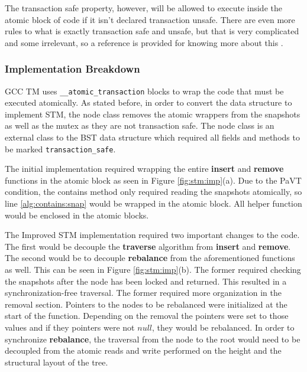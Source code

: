 \documentclass[conference]{IEEEtran}
\theoremstyle{definition}
\theoremstyle{theorem}
\begin{document}
The transaction safe property, however, will be allowed to execute inside the atomic block of code if it isn't declared transaction unsafe. There are even more rules to what is exactly transaction safe and unsafe, but that is very complicated and some irrelevant, so a reference is provided for knowing more about this \cite{b4}. 

\subsubsection{Implementation Breakdown}

GCC TM uses \texttt{\_\_atomic\_transaction} blocks to wrap the code that must be executed atomically. As stated before, in order to convert the data structure to implement STM, the node class removes the atomic wrappers from the snapshots as well as the mutex as they are not transaction safe. The node class is an external class to the BST data structure which required all fields and methods to be marked \texttt{transaction\_safe}. 

The initial implementation required wrapping the entire \textbf{insert} and \textbf{remove} functions in the atomic block as seen in Figure \ref{fig:stm:imp}(a). Due to the PaVT condition, the contains method only required reading the snapshots atomically, so line \ref{alg:contains:snap} would be wrapped in the atomic block. All helper function would be enclosed in the atomic blocks.

The Improved STM implementation required two important changes to the code. The first would be decouple the \textbf{traverse} algorithm from \textbf{insert} and \textbf{remove}. The second would be to decouple \textbf{rebalance} from the aforementioned functions as well. This can be seen in Figure \ref{fig:stm:imp}(b). The former required checking the snapshots after the node has been locked and returned. This resulted in a synchronization-free traversal. The former required more organization in the removal section. Pointers to the nodes to be rebalanced were initialized at the start of the function. Depending on the removal the pointers were set to those values and if they pointers were not $null$, they would be rebalanced. In order to synchronize \textbf{rebalance}, the traversal from the node to the root would need to be decoupled from the atomic reads and write performed on the height and the structural layout of the tree. 
\end{document}

